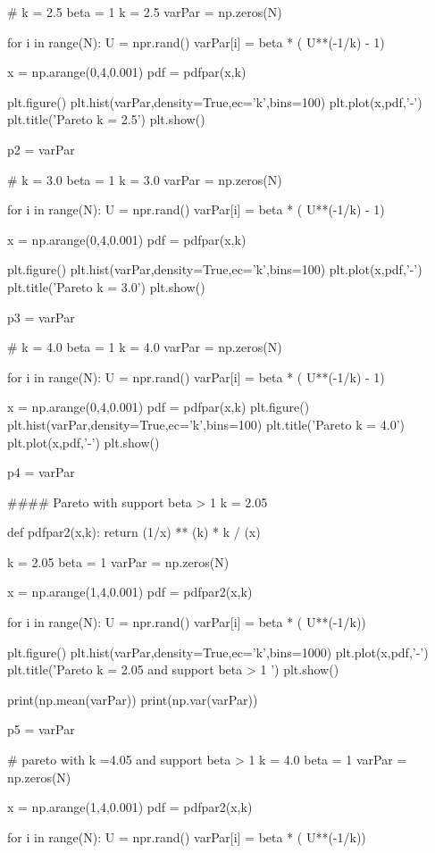\begin{python}
# k = 2.5
beta = 1
k = 2.5
varPar = np.zeros(N)

for i in range(N):
    U = npr.rand()
    varPar[i] = beta * ( U**(-1/k) - 1)



x = np.arange(0,4,0.001)
pdf = pdfpar(x,k)

plt.figure()
plt.hist(varPar,density=True,ec='k',bins=100)
plt.plot(x,pdf,'-')
plt.title('Pareto k = 2.5')
plt.show()

p2 = varPar


# k = 3.0
beta = 1
k = 3.0
varPar = np.zeros(N)

for i in range(N):
    U = npr.rand()
    varPar[i] = beta * ( U**(-1/k) - 1)

x = np.arange(0,4,0.001)
pdf = pdfpar(x,k)

plt.figure()
plt.hist(varPar,density=True,ec='k',bins=100)
plt.plot(x,pdf,'-')
plt.title('Pareto k = 3.0')
plt.show()

p3 = varPar


# k = 4.0
beta = 1
k = 4.0
varPar = np.zeros(N)

for i in range(N):
    U = npr.rand()
    varPar[i] = beta * ( U**(-1/k) - 1)


x = np.arange(0,4,0.001)
pdf = pdfpar(x,k)
plt.figure()
plt.hist(varPar,density=True,ec='k',bins=100)
plt.title('Pareto k = 4.0')
plt.plot(x,pdf,'-')
plt.show()

p4 = varPar



#### Pareto with support beta > 1 k = 2.05

def pdfpar2(x,k):
    return (1/x) ** (k) * k / (x)

k = 2.05
beta = 1
varPar = np.zeros(N)

x = np.arange(1,4,0.001)
pdf = pdfpar2(x,k)


for i in range(N):
    U = npr.rand()
    varPar[i] = beta * ( U**(-1/k))

plt.figure()
plt.hist(varPar,density=True,ec='k',bins=1000)
plt.plot(x,pdf,'-')
plt.title('Pareto k = 2.05 and support beta > 1 ')
plt.show()

print(np.mean(varPar))
print(np.var(varPar))

p5 = varPar



# pareto with k =4.05 and support beta > 1
k = 4.0
beta = 1
varPar = np.zeros(N)

x = np.arange(1,4,0.001)
pdf = pdfpar2(x,k)


for i in range(N):
    U = npr.rand()
    varPar[i] = beta * ( U**(-1/k))


\end{python}
